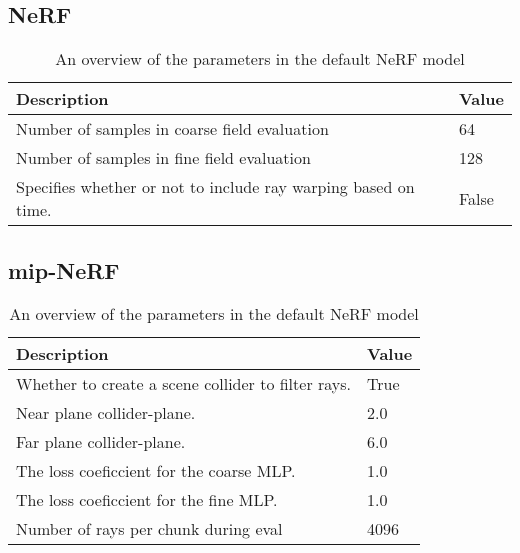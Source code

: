 \subsection{NeRF}
\begin{table}[h]
    \centering
    \begin{tabular}{|l|l|}
    \hline
    \textbf{Description} & \textbf{Value} \\ 
    \hline
    Number of samples in coarse field evaluation & 64 \\
    Number of samples in fine field evaluation & 128 \\
    Specifies whether or not to include ray warping based on time. & False \\
    \hline
    \end{tabular}
    \caption{An overview of the parameters in the default NeRF model}
    \label{tab:instant-ngp-parameter-overview}
\end{table}

\subsection{mip-NeRF}
\begin{table}[h]
    \centering
    \begin{tabular}{|l|l|}
    \hline
    \textbf{Description} & \textbf{Value} \\ 
    \hline
    Whether to create a scene collider to filter rays.  & True \\
    Near plane collider-plane.                          & 2.0 \\
    Far plane collider-plane.                           & 6.0 \\
    The loss coeficcient for the coarse MLP.            & 1.0 \\
    The loss coeficcient for the fine MLP.              & 1.0 \\
    Number of rays per chunk during eval                & 4096 \\
    \hline
    \end{tabular}
    \caption{An overview of the parameters in the default NeRF model}
    \label{tab:instant-ngp-parameter-overview}
\end{table}


